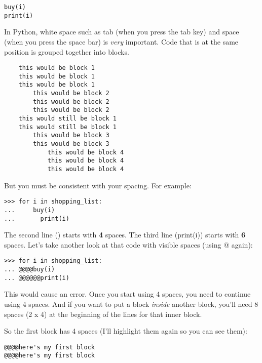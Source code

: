 \begin{listing}
\begin{verbatim}
buy(i)
print(i)
\end{verbatim}
\end{listing}

In Python, white space such as tab (when you press the tab key) and space (when you press the space bar) is \emph{very} important.  Code that is at the same position is grouped together into blocks.

\begin{listing}
\begin{verbatim}
	this would be block 1
	this would be block 1
	this would be block 1
	    this would be block 2
	    this would be block 2
	    this would be block 2
	this would still be block 1
	this would still be block 1
	    this would be block 3
	    this would be block 3
	        this would be block 4
	        this would be block 4
	        this would be block 4
\end{verbatim}
\end{listing}

But you must be consistent with your spacing.  For example:

\begin{listing}
\begin{verbatim}
>>> for i in shopping_list:
...     buy(i)
...       print(i)
\end{verbatim}
\end{listing}

The second line () starts with \textbf{4} spaces.  The third line (print(i)) starts with \textbf{6} spaces.  Let's take another look at that code with visible spaces (using @ again):

\begin{listing}
\begin{verbatim}
>>> for i in shopping_list:
... @@@@buy(i)
... @@@@@@print(i)
\end{verbatim}
\end{listing}

This would cause an error.  Once you start using 4 spaces, you need to continue using 4 spaces.  And if you want to put a block \emph{inside} another block, you'll need 8 spaces (2 x 4) at the beginning of the lines for that inner block.
\par
So the first block has 4 spaces (I'll highlight them again so you can see them):

\begin{listing}
\begin{verbatim}
@@@@here's my first block
@@@@here's my first block
\end{verbatim}
\end{listing}

